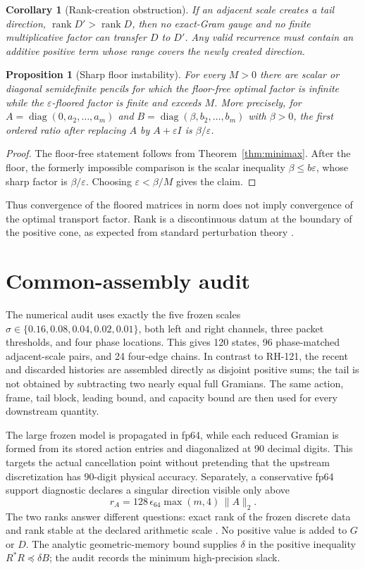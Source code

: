 \documentclass[12pt]{article}
\newtheorem{corollary}[theorem]{Corollary}
\newtheorem{proposition}[theorem]{Proposition}
\newcommand{\rank}{\operatorname{rank}}
\begin{document}
\begin{corollary}[Rank-creation obstruction]\label{cor:rank}
If an adjacent scale creates a tail direction,
$\rank D'>\rank D$, then no exact-Gram gauge and no finite multiplicative
factor can transfer $D$ to $D'$.  Any valid recurrence must contain an
additive positive term whose range covers the newly created direction.
\end{corollary}

\begin{proposition}[Sharp floor instability]\label{prop:floor}
For every $M>0$ there are scalar or diagonal semidefinite pencils for which
the floor-free optimal factor is infinite while the $\varepsilon$-floored
factor is finite and exceeds $M$.  More precisely, for
$A=\operatorname{diag}(0,a_2,\ldots,a_m)$ and
$B=\operatorname{diag}(\beta,b_2,\ldots,b_m)$ with $\beta>0$,
the first ordered ratio after replacing $A$ by $A+\varepsilon I$ is
$\beta/\varepsilon$.
\end{proposition}
\begin{proof}
The floor-free statement follows from Theorem~\ref{thm:minimax}.  After the
floor, the formerly impossible comparison is the scalar inequality
$\beta\leq b\varepsilon$, whose sharp factor is $\beta/\varepsilon$.
Choosing $\varepsilon<\beta/M$ gives the claim.
\end{proof}

Thus convergence of the floored matrices in norm does not imply convergence
of the optimal transport factor.  Rank is a discontinuous datum at the
boundary of the positive cone, as expected from standard perturbation
theory \citep{Kato1995,HornJohnson1991}.

\section{Common-assembly audit}
The numerical audit uses exactly the five frozen scales
$\sigma\in\{0.16,0.08,0.04,0.02,0.01\}$, both left and right channels,
three packet thresholds, and four phase locations.  This gives 120 states,
96 phase-matched adjacent-scale pairs, and 24 four-edge chains.  In contrast
to RH-121, the recent and discarded histories are assembled directly as
disjoint positive sums; the tail is not obtained by subtracting two nearly
equal full Gramians.  The same action, frame, tail block, leading bound, and
capacity bound are then used for every downstream quantity.

The large frozen model is propagated in fp64, while each reduced Gramian is
formed from its stored action entries and diagonalized at 90 decimal digits.
This targets the actual cancellation point without pretending that the
upstream discretization has 90-digit physical accuracy.  Separately, a
conservative fp64 support diagnostic declares a singular direction visible
only above
\[
 r_A=128\,\epsilon_{64}\max(m,4)\,\|A\|_2.
\]
The two ranks answer different questions: exact rank of the frozen discrete
data and rank stable at the declared arithmetic scale \citep{Higham2002}.
No positive value is added to $G$ or $D$.  The analytic geometric-memory
bound supplies $\delta$ in the positive inequality
$R^*R\preceq\delta B$; the audit records the minimum high-precision slack.
\end{document}
